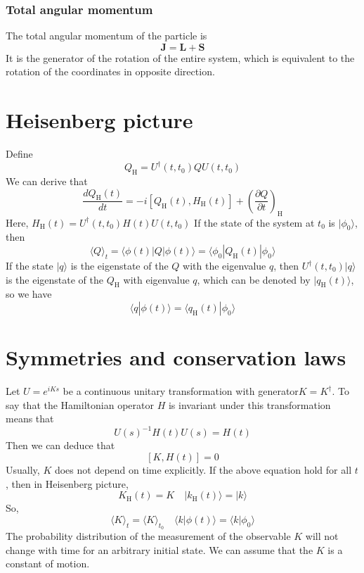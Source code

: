 \subsubsection{Total angular momentum}
\noindent
The total angular momentum of the particle is 
\[\bm{J} = \bm{L} + \bm{S}\]
It is the generator of the rotation of the entire system, which is equivalent to the rotation of the coordinates in opposite direction.

\section{Heisenberg picture}
\noindent
Define
\[Q_{\mathrm{H}} = U^{\dagger}(t,t_0)QU(t,t_0)\]
We can derive that
\[\frac{dQ_{\mathrm{H}}(t)}{dt} = -i[Q_{\mathrm{H}}(t),H_{\mathrm{H}}(t)] + \left(\frac{\partial Q}{\partial t}\right)_{\mathrm{H}} \]
Here, $H_{\mathrm{H}}(t) = U^{\dagger}(t,t_0) H(t) U(t,t_0)$
If the state of the system at $t_0$ is $|\phi_0\rangle$, then
\[\langle Q \rangle_t = \langle \phi(t) | Q | \phi(t) \rangle = \langle \phi_0 | Q_{\mathrm{H}}(t) | \phi_0 \rangle\]
If the state $|q\rangle$ is the eigenstate of the $Q$ with the eigenvalue $q$, then $U^{\dagger}(t,t_0)|q\rangle$ is the eigenstate of the $Q_{\mathrm{H}}$ with eigenvalue $q$, which can be denoted by $|q_{\mathrm{H}}(t)\rangle$, so we have
\[\langle q | \phi(t) \rangle = \langle q_{\mathrm{H}}(t) | \phi_0 \rangle\]

\section{Symmetries and conservation laws}
\noindent
Let $U = e^{iKs}$ be a continuous unitary transformation with generator$K=K^{\dagger}$. To say that the Hamiltonian
operator $H$ is invariant under this transformation means that
\[U(s)^{-1} H(t) U(s) = H(t)\]
Then we can deduce that
\[[K,H(t)] = 0\]
Usually, $K$ does not depend on time explicitly. If the above equation hold for all $t$, then in Heisenberg picture, 
\[K_{\mathrm{H}}(t) = K \quad |k_{\mathrm{H}}(t) \rangle = | k \rangle\]
So, 
\[\langle K \rangle_t = \langle K \rangle_{t_0} \quad \langle k | \phi(t) \rangle = \langle k | \phi_0 \rangle\]
The probability distribution of the measurement of the observable $K$ will not change with time for an arbitrary initial state. We can assume that the $K$ is a constant of motion.

